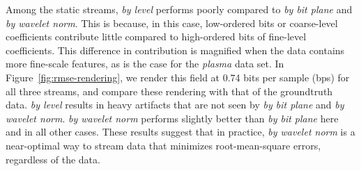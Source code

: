 Among the static streams, \emph{by level} performs poorly compared to \emph{by bit plane} and
\emph{by wavelet norm}. This is because, in this case, low-ordered bits or coarse-level coefficients
contribute little compared to high-ordered bits of fine-level coefficients. This difference in
contribution is magnified when the data contains more fine-scale features, as is the case for the
\emph{plasma} data set. In Figure~\ref{fig:rmse-rendering}, we render this field at 0.74 bits per
sample (bps) for all three streams, and compare these rendering with that of the groundtruth data.
\emph{by level} results in heavy artifacts that are not seen by \emph{by bit plane} and
\emph{by wavelet norm}. \emph{by wavelet norm} performs slightly better than \emph{by bit plane}
here and in all other cases. These results suggest that in practice, \emph{by wavelet norm} is a
near-optimal way to stream data that minimizes root-mean-square errors, regardless of the data.

